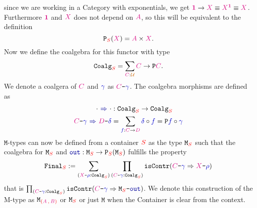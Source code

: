\documentclass[twoside,11pt,openright]{report}
\newcommand*{\term}[1]{\textcolor{blue!80!black}{#1}}
\newcommand*{\type}[1]{\textcolor{magenta!90!black}{#1}}
\newcommand*{\container}[1]{\textcolor{red}{#1}}
\newcommand*{\containerpair}[2]{\textcolor{red}{(}#1\,\textcolor{red}{,}\,#2\textcolor{red}{)}}
\newcommand*{\universe}[1]{\textcolor{orange!80!black}{#1}}
\newcommand*{\unit}{\type{\textbf{1}}}
\newcommand*{\coalg}[2]{#1\texttt{-}#2}
\newcommand*{\function}[1]{\textcolor{blue!60!black}{\ensuremath{\mathtt{#1}}}}
\newcommand*{\typeformer}[1]{\ensuremath{\mathtt{#1}}}
\newcommand*{\functor}[1]{\ensuremath{\mathbf{\mathtt{#1}}}}
\begin{document}
since we are working in a Category with exponentials, we get \(\unit \rightarrow \type{X} \equiv \type{X}^{\unit} \equiv \type{X}\). Furthermore \(\unit\) and \(\type{X}\) does not depend on \(\type{A}\), so this will be equivalent to the definition
\begin{equation}
  \functor{P}_{\container{S}}(\type{X}) = \type{A} \times \type{X}.
\end{equation}
Now we define the coalgebra for this functor with type
\begin{equation}
  \typeformer{Coalg}_{\container{S}} = \sum_{\type{C} : \universe{\mathcal{U}}} \type{C} \rightarrow \functor{P}\type{C}.
\end{equation}
We denote a coalgera of \(\type{C}\) and \(\term{\gamma}\) as \(\coalg{\type{C}}{\term{\gamma}}\). The coalgebra morphisms are defined as
\begin{equation}
  \begin{aligned}
    \cdot~\function{\Rightarrow}~\cdot &: \typeformer{Coalg}_{\container{S}} \rightarrow \typeformer{Coalg}_{\container{S}} \\
    \coalg{\type{C}}{\term{\gamma}}~\function{\Rightarrow}~\coalg{\type{D}}{\term{\delta}} &= \sum_{\term{f} : \type{C} \rightarrow \type{D}} \term{\delta} \circ \term{f} = \functor{P} \term{f} \circ \term{\gamma}
  \end{aligned}
\end{equation}
\(\mathtt{M}\)-types can now be defined from a container \(\container{S}\) as the type \(\typeformer{M}_{\container{S}}\) such that the coalgebra for \(\typeformer{M}_{\container{S}}\) and \(\function{out} : \typeformer{M}_{\container{S}} \rightarrow \functor{P}_{\container{S}}(\typeformer{M}_{\container{S}})\) fulfills the property
\begin{equation}
  \typeformer{Final}_{\container{S}} := \sum_{(\coalg{\type{X}}{\term{\rho}} : \mathtt{Coalg}_{\container{S}})} \prod_{(\coalg{\type{C}}{\term{\term{\gamma}}} : \mathtt{Coalg}_{\container{S}})} \mathtt{isContr}(\coalg{\type{C}}{\term{\gamma}} \Rightarrow \coalg{\type{X}}{\term{\rho}})
\end{equation}
that is \(\prod_{(\coalg{\type{C}}{\term{\gamma}} : \mathtt{Coalg}_{\container{S}})} \mathtt{isContr}(\coalg{\type{C}}{\term{\gamma}} \Rightarrow \coalg{\typeformer{M}_{\container{S}}}{\function{out}})\). We denote this construction of the M-type as \(\typeformer{M}_{\containerpair{\type{A}}{\type{B}}}\) or \(\typeformer{M}_{\container{S}}\) or just \(\typeformer{M}\) when the Container is clear from the context.
\end{document}
